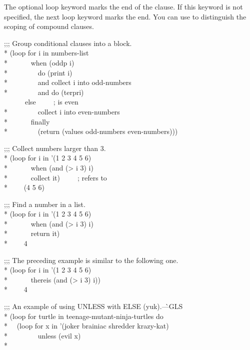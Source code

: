 \begin{defloop}
The optional loop keyword  marks the end of the clause.  If this
keyword is not specified, the next loop keyword marks the end.  You can use
 to distinguish the scoping of compound clauses.
\begin{lisp}
;;; Group conditional clauses into a block. \\*
(loop for i in numbers-list \\*
~~~~~~when (oddp i) \\*
~~~~~~~~do (print i) \\*
~~~~~~~~and collect i into odd-numbers \\*
~~~~~~~~and do (terpri) \\
~~~~~~else~~~~~;{\rm {} is even} \\*
~~~~~~~~collect i into even-numbers \\*
~~~~~~finally \\*
~~~~~~~~(return (values odd-numbers even-numbers)))
\end{lisp}
\begin{lisp}
;;; Collect numbers larger than 3. \\*
(loop for i in '(1 2 3 4 5 6) \\*
~~~~~~when (and (> i 3) i) \\*
~~~~~~collect it)~~~~~;{\rm {} refers to } \\*
~~~\EV~(4 5 6)
\end{lisp}
\begin{lisp}
;;; Find a number in a list. \\*
(loop for i in '(1 2 3 4 5 6) \\*
~~~~~~when (and (> i 3) i) \\*
~~~~~~return it) \\*
~~~\EV~4
\end{lisp}
\begin{lisp}
;;; The preceding example is similar to the following one. \\*
(loop for i in '(1 2 3 4 5 6) \\*
~~~~~~thereis (and (> i 3) i)) \\*
~~~\EV~4
\end{lisp}
\begin{lisp}
;;; An example of using UNLESS with ELSE (yuk).\`{\rm ---GLS} \\*
(loop for turtle in teenage-mutant-ninja-turtles do\\*
~~(loop for x in '(joker brainiac shredder krazy-kat) \\*
~~~~~~~~unless (evil x) \\*

\end{lisp}
\end{defloop}
